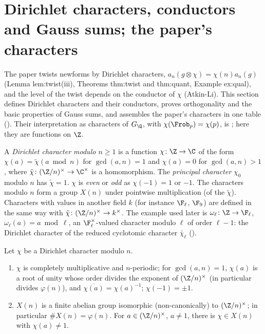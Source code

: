 \section[Dirichlet characters and Gauss sums]{Dirichlet characters, conductors and Gauss sums; the paper's characters}\label{sec:rings:dirichlet}

The paper twists newforms by Dirichlet characters, $a_n(g\otimes\chi)=\chi(n)a_n(g)$ (Lemma lem:twist(iii), Theorems thm:twist and
thm:quant, Example ex:qual), and the level of the twist depends on the conductor of $\chi$ (Atkin-Li). This section defines
Dirichlet characters and their conductors, proves orthogonality and the basic properties of Gauss sums, and
assembles the paper's characters in one table (). Their interpretation as characters of
$G_\Q$, with $\chi(\Frob_p)=\chi(p)$, is ; here they are functions on $\Z$.

\begin{definition}\label{def:rings:dirichlet}
A \emph{Dirichlet character modulo $n\ge1$} is a function $\chi\colon\Z\to\C$ of the form $\chi(a)=\tilde\chi(a\bmod n)$ for $\gcd(a,n)=1$ and $\chi(a)=0$ for
$\gcd(a,n)>1$, where $\tilde\chi\colon(\Z/n)^\times\to\C^\times$ is a homomorphism. The \emph{principal character} $\chi_0$ modulo $n$ has $\tilde\chi=1$. $\chi$ is \emph{even} or
\emph{odd} as $\chi(-1)=1$ or $-1$. The characters modulo $n$ form a group $X(n)$ under pointwise multiplication (of the $\tilde\chi$). Characters
with values in another field $k$ (for instance $\F_\ell$, $\F_9$) are defined in the same way with $\tilde\chi\colon(\Z/n)^\times\to k^\times$. The example used later is
$\omega_\ell\colon\Z\to\F_\ell$, $\omega_\ell(a)=a\bmod\ell$, an $\F_\ell^\times$-valued character modulo $\ell$ of order $\ell-1$: the Dirichlet character of the reduced
cyclotomic character $\bar\chi_\ell$ ().
\end{definition}

\begin{proposition}\label{prop:rings:dirichlet}
Let $\chi$ be a Dirichlet character modulo $n$.
\begin{enumerate}[label=(\roman*)]
\item $\chi$ is completely multiplicative and $n$-periodic; for $\gcd(a,n)=1$, $\chi(a)$ is a root of unity whose order divides the exponent of
$(\Z/n)^\times$ (in particular divides $\varphi(n)$), and $\overline{\chi(a)}=\chi(a)^{-1}$; $\chi(-1)=\pm1$.
\item $X(n)$ is a finite abelian group isomorphic (non-canonically) to $(\Z/n)^\times$; in particular $\#X(n)=\varphi(n)$. For $a\in(\Z/n)^\times$, $a\ne1$, there
is $\chi\in X(n)$ with $\chi(a)\ne1$.
\end{enumerate}
\end{proposition}

